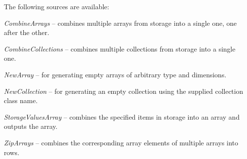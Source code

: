 \noindent The following sources are available:
\begin{tight_itemize}
	\item \textit{CombineArrays} -- combines multiple arrays from storage into a single one, one after the other.
	\item \textit{CombineCollections} -- combines multiple collections from storage into a single one.
	\item \textit{NewArray} -- for generating empty arrays of arbitrary type
	and dimensions.
	\item \textit{NewCollection} -- for generating an empty collection using
	the supplied collection class name.
	\item \textit{StorageValuesArray} -- combines the specified items in
	storage into an array and outputs the array.
	\item \textit{ZipArrays} -- combines the corresponding array elements of multiple arrays into rows.
\end{tight_itemize}

